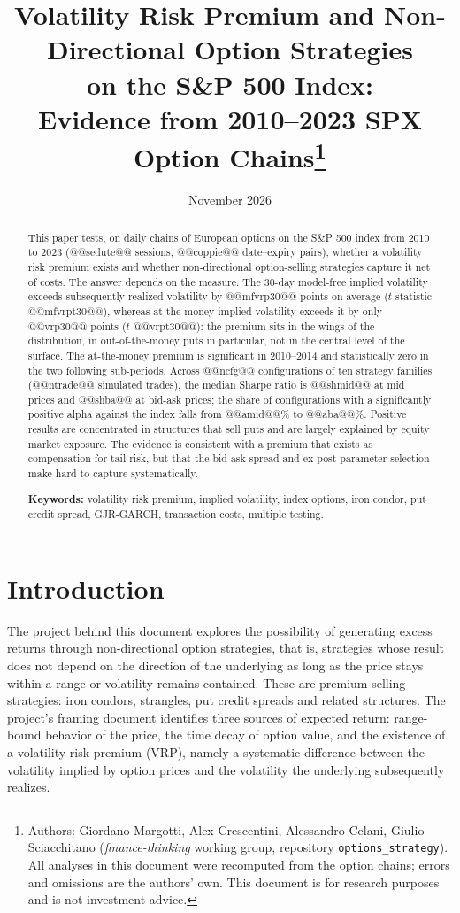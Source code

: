 \documentclass[11pt,a4paper]{article}
\title{Volatility Risk Premium and Non-Directional Option Strategies\\ on the S\&P 500 Index:\\ Evidence from 2010--2023 SPX Option Chains\thanks{Authors: Giordano Margotti, Alex Crescentini, Alessandro Celani, Giulio Sciacchitano (\emph{finance-thinking} working group, repository \texttt{options\_strategy}). All analyses in this document were recomputed from the option chains; errors and omissions are the authors' own. This document is for research purposes and is not investment advice.}}
\author{}
\date{November 2026}
\begin{document}
{\let\newpage\relax\maketitle}
\vspace{-3em}

\begin{abstract}
\noindent This paper tests, on daily chains of European options on the S\&P 500 index from 2010 to 2023 (@@sedute@@ sessions, @@coppie@@ date--expiry pairs), whether a volatility risk premium exists and whether non-directional option-selling strategies capture it net of costs. The answer depends on the measure. The 30-day model-free implied volatility exceeds subsequently realized volatility by @@mfvrp30@@ points on average ($t$-statistic @@mfvrpt30@@), whereas at-the-money implied volatility exceeds it by only @@vrp30@@ points ($t$ @@vrpt30@@): the premium sits in the wings of the distribution, in out-of-the-money puts in particular, not in the central level of the surface. The at-the-money premium is significant in 2010--2014 and statistically zero in the two following sub-periods. Across @@ncfg@@ configurations of ten strategy families (@@ntrade@@ simulated trades), the median Sharpe ratio is @@shmid@@ at mid prices and @@shba@@ at bid-ask prices; the share of configurations with a significantly positive alpha against the index falls from @@amid@@\% to @@aba@@\%. Positive results are concentrated in structures that sell puts and are largely explained by equity market exposure. The evidence is consistent with a premium that exists as compensation for tail risk, but that the bid-ask spread and ex-post parameter selection make hard to capture systematically.

\medskip\noindent\textbf{Keywords:} volatility risk premium, implied volatility, index options, iron condor, put credit spread, GJR-GARCH, transaction costs, multiple testing.
\end{abstract}

\section{Introduction}

The project behind this document explores the possibility of generating excess returns through non-directional option strategies, that is, strategies whose result does not depend on the direction of the underlying as long as the price stays within a range or volatility remains contained. These are premium-selling strategies: iron condors, strangles, put credit spreads and related structures. The project's framing document identifies three sources of expected return: range-bound behavior of the price, the time decay of option value, and the existence of a volatility risk premium (VRP), namely a systematic difference between the volatility implied by option prices and the volatility the underlying subsequently realizes.
\end{document}
